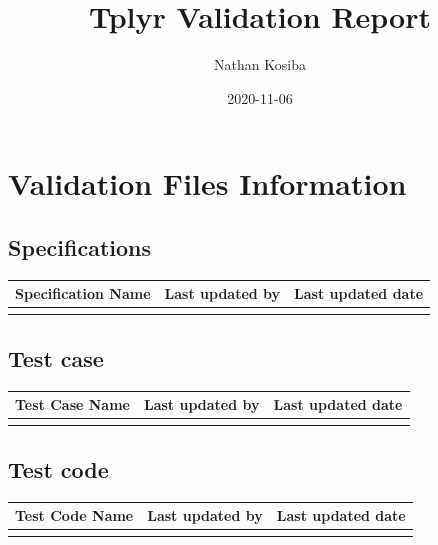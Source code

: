 \documentclass[
]{article}
\title{Tplyr Validation Report}
\author{Nathan Kosiba}
\date{2020-11-06}
\begin{document}
\maketitle

\newpage
\tableofcontents
\newpage

\hypertarget{validation-files-information}{%
\section{Validation Files
Information}\label{validation-files-information}}

\hypertarget{specifications}{%
\subsection{Specifications}\label{specifications}}

\begin{table}[H]
\centering
\begin{tabular}{lll}
\toprule
Specification Name & Last updated by & Last updated date\\
\midrule
\cellcolor{gray!6}{specification.Rmd} & \cellcolor{gray!6}{Nathan Kosiba} & \cellcolor{gray!6}{2020-11-05}\\
\bottomrule
\end{tabular}
\end{table}

\hypertarget{test-case}{%
\subsection{Test case}\label{test-case}}

\begin{table}[H]
\centering
\begin{tabular}{lll}
\toprule
Test Case Name & Last updated by & Last updated date\\
\midrule
\cellcolor{gray!6}{test\_cases.Rmd} & \cellcolor{gray!6}{Nathan Kosiba} & \cellcolor{gray!6}{2020-11-05}\\
\bottomrule
\end{tabular}
\end{table}

\hypertarget{test-code}{%
\subsection{Test code}\label{test-code}}

\begin{table}[H]
\centering
\begin{tabular}{lll}
\toprule
Test Code Name & Last updated by & Last updated date\\
\midrule
\cellcolor{gray!6}{test\_cases.R} & \cellcolor{gray!6}{Nathan Kosiba} & \cellcolor{gray!6}{2020-11-06}\\
\bottomrule
\end{tabular}
\end{table}
\end{document}
